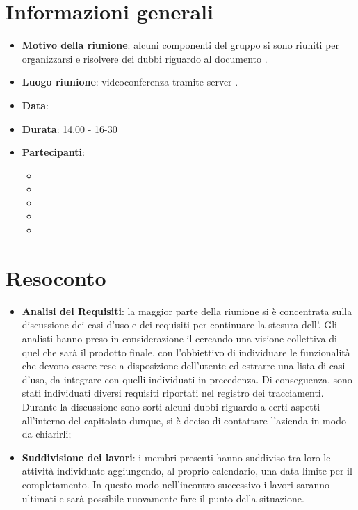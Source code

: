 \section{Informazioni generali}
\begin{itemize}
\item \textbf{Motivo della riunione}: alcuni componenti del gruppo si sono riuniti per organizzarsi e risolvere dei dubbi riguardo al documento \AdR.
\item \textbf{Luogo riunione}: videoconferenza tramite server .
\item \textbf{Data}: \Data{}
\item \textbf{Durata}: 14.00 - 16-30
\item \textbf{Partecipanti}:
	\begin{itemize}
	\item \BM{}
	\item \SG{}
	\item \SP{}
	\item \SH{}
	\item \PA{}
	\end{itemize}
\end{itemize}
\newpage
\section{Resoconto}
\begin{itemize}
\item \textbf{Analisi dei Requisiti}: la maggior parte della riunione si è concentrata sulla discussione dei casi d'uso e dei requisiti per continuare la stesura dell'\AdRv{}.
Gli analisti hanno preso in considerazione il  cercando una visione collettiva di quel che sarà il prodotto finale, con l'obbiettivo di individuare le funzionalità che devono essere rese a disposizione dell'utente ed estrarre una lista di casi d'uso, da integrare con quelli individuati in precedenza. Di conseguenza, sono stati individuati diversi requisiti riportati nel registro dei tracciamenti.\\
Durante la discussione sono sorti alcuni dubbi riguardo a certi aspetti all'interno del capitolato dunque, si è deciso di contattare l'azienda in modo da chiarirli;

\item \textbf{Suddivisione dei lavori}: i membri presenti hanno suddiviso tra loro le attività individuate aggiungendo, al proprio calendario, una data limite per il completamento. In questo modo nell'incontro successivo i lavori saranno ultimati e sarà possibile nuovamente fare il punto della situazione.

\end{itemize}

 